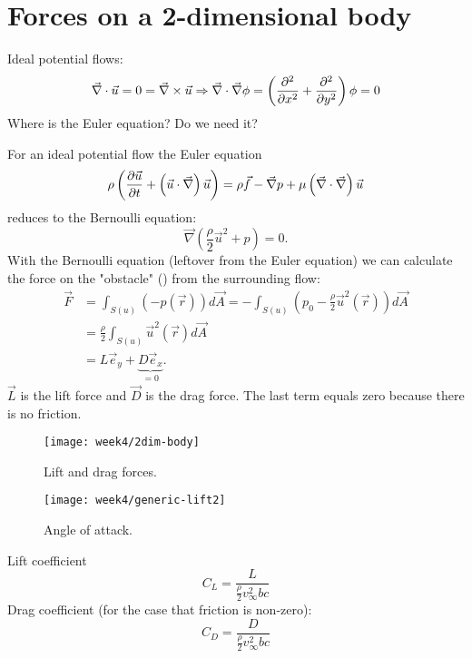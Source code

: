 \section{Forces on a 2-dimensional body}
\begin{framed}
Ideal potential flows:
\begin{equation}
\vec{\nabla}\cdot\vec{u}=0=\vec{\nabla}\times\vec{u}\Rightarrow\vec{\nabla}\cdot\vec{\nabla}\phi = \left(\frac{\partial^2 }{\partial x^2}+\frac{\partial^2 }{\partial y^2}\right)\phi=0
\end{equation}
Where is the Euler equation? Do we need it?
\end{framed}
For an ideal potential flow the Euler equation
\begin{equation}
\rho \left(\frac{\partial \vec{u}}{\partial t}+\left(\vec{u}\cdot\vec{\nabla}\right)\vec{u}\right) = \rho \vec{f} - \vec{\nabla}p + \mu\left(\vec{\nabla}\cdot\vec{\nabla}\right)\vec{u}
\end{equation}
reduces to the Bernoulli equation:
\begin{equation}
\vec{\nabla}\left(\frac{\rho}{2}\vec{u}^2+p\right)=0.
\end{equation}
With the Bernoulli equation (leftover from the Euler equation) we can calculate the force on the "obstacle" () from the surrounding flow:
\begin{align}
\vec{F} &= \int_{S(u)}(-p(\vec{r}))d\vec{A} = -\int_{S(u)}\left(p_0-\frac{\rho}{2}\vec{u}^2(\vec{r})\right)d\vec{A} \\
&= \frac{\rho}{2}\int_{S(u)}\vec{u}^2(\vec{r})d\vec{A}\\
&= L\vec{e}_y +\underbrace{D\vec{e}_x}_{=0}.
\end{align}
$\vec{L}$ is the lift force and $\vec{D}$ is the drag force. The last term equals zero because there is no friction.

\begin{figure}[!h]
    \centering
    \texttt{[image: week4/2dim-body]}\\
    \caption{Lift and drag forces.}
    \label{fig:2dim-body}
\end{figure}

\begin{figure}[!h]
    \centering
    \texttt{[image: week4/generic-lift2]}\\
    \caption{Angle of attack.}
    \label{fig:generic-lift2}
\end{figure}

Lift coefficient
\begin{equation}
C_L = \frac{L}{\frac{\rho}{2}v_\infty^2 b c}
\end{equation}
Drag coefficient (for the case that friction is non-zero):
\begin{equation}
C_D = \frac{D}{\frac{\rho}{2}v_\infty^2 b c}
\end{equation}

